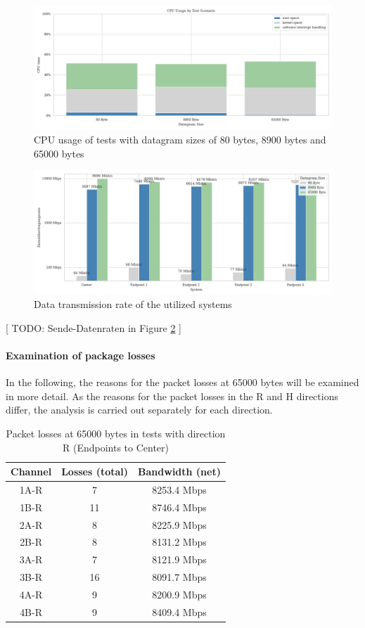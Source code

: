 \documentclass[	a4paper,
				11pt,
				DIV=11,
				bigheadings,
				idxtotoc,
				listof=totoc,	
				bibtotoc,		
				halfparskip,
				cleardoubleempty,
				oneside,
				openright]{scrartcl}
\begin{document}
\begin{figure}[h]
	\includegraphics[width=\textwidth]{su1.png}
	\centering
	\caption{CPU usage of tests with datagram sizes of 80 bytes, 8900 bytes and 65000 bytes}
    \label{fig:su1}
\end{figure}

\begin{figure}[h]
	\includegraphics[width=\textwidth]{su3.png}
	\centering
	\caption{Data transmission rate of the utilized systems}
    \label{fig:su3}
\end{figure}

[
TODO: Sende-Datenraten in Figure \ref{fig:su3}
]



\paragraph*{Examination of package losses}
In the following, the reasons for the packet losses at 65000 bytes will be examined in more detail. As the reasons for the packet losses in the R and H directions differ, the analysis is carried out separately for each direction.

\begin{table}[h]
\centering
\begin{tabular}{||c c c||} 
 \hline
 Channel & Losses (total) & Bandwidth (net) \\ [0.5ex] 
 \hline\hline
 1A-R & 7  & 8253.4 Mbps \\ 
 1B-R & 11 & 8746.4 Mbps \\
 2A-R & 8  & 8225.9 Mbps \\
 2B-R & 8  & 8131.2 Mbps \\
 3A-R & 7  & 8121.9 Mbps \\
 3B-R & 16 & 8091.7 Mbps \\
 4A-R & 9  & 8200.9 Mbps \\
 4B-R & 9  & 8409.4 Mbps \\ [1ex] 
 \hline
\end{tabular}
\caption{ Packet losses at 65000 bytes in tests with direction R (Endpoints to Center)}
\label{table:1}
\end{table}
\end{document}
